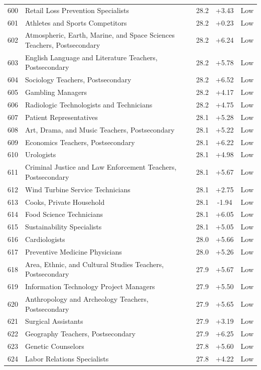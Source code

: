 {\begin{longtable}{rp{7cm}ccc}
600 & Retail Loss Prevention Specialists & 28.2 & +3.43 & Low \\
601 & Athletes and Sports Competitors & 28.2 & +0.23 & Low \\
602 & Atmospheric, Earth, Marine, and Space Sciences Teachers, Postsecondary & 28.2 & +6.24 & Low \\
603 & English Language and Literature Teachers, Postsecondary & 28.2 & +5.78 & Low \\
604 & Sociology Teachers, Postsecondary & 28.2 & +6.52 & Low \\
605 & Gambling Managers & 28.2 & +4.17 & Low \\
606 & Radiologic Technologists and Technicians & 28.2 & +4.75 & Low \\
607 & Patient Representatives & 28.1 & +5.28 & Low \\
608 & Art, Drama, and Music Teachers, Postsecondary & 28.1 & +5.22 & Low \\
609 & Economics Teachers, Postsecondary & 28.1 & +6.22 & Low \\
610 & Urologists & 28.1 & +4.98 & Low \\
611 & Criminal Justice and Law Enforcement Teachers, Postsecondary & 28.1 & +5.67 & Low \\
612 & Wind Turbine Service Technicians & 28.1 & +2.75 & Low \\
613 & Cooks, Private Household & 28.1 & -1.94 & Low \\
614 & Food Science Technicians & 28.1 & +6.05 & Low \\
615 & Sustainability Specialists & 28.1 & +5.05 & Low \\
616 & Cardiologists & 28.0 & +5.66 & Low \\
617 & Preventive Medicine Physicians & 28.0 & +5.26 & Low \\
618 & Area, Ethnic, and Cultural Studies Teachers, Postsecondary & 27.9 & +5.67 & Low \\
619 & Information Technology Project Managers & 27.9 & +5.50 & Low \\
620 & Anthropology and Archeology Teachers, Postsecondary & 27.9 & +5.65 & Low \\
621 & Surgical Assistants & 27.9 & +3.19 & Low \\
622 & Geography Teachers, Postsecondary & 27.9 & +6.25 & Low \\
623 & Genetic Counselors & 27.8 & +5.60 & Low \\
624 & Labor Relations Specialists & 27.8 & +4.22 & Low \\

\end{longtable}}
